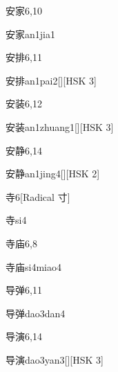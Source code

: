 \begin{entry}{安家}{6,10}
  \begin{phonetics}{安家}{an1jia1}
  \end{phonetics}
\end{entry}

\begin{entry}{安排}{6,11}
  \begin{phonetics}{安排}{an1pai2}[][HSK 3]
  \end{phonetics}
\end{entry}

\begin{entry}{安装}{6,12}
  \begin{phonetics}{安装}{an1zhuang1}[][HSK 3]
  \end{phonetics}
\end{entry}

\begin{entry}{安静}{6,14}
  \begin{phonetics}{安静}{an1jing4}[][HSK 2]
  \end{phonetics}
\end{entry}

\begin{entry}{寺}{6}[Radical 寸]
  \begin{phonetics}{寺}{si4}
  \end{phonetics}
\end{entry}

\begin{entry}{寺庙}{6,8}
  \begin{phonetics}{寺庙}{si4miao4}
  \end{phonetics}
\end{entry}

\begin{entry}{导弹}{6,11}
  \begin{phonetics}{导弹}{dao3dan4}
  \end{phonetics}
\end{entry}

\begin{entry}{导演}{6,14}
  \begin{phonetics}{导演}{dao3yan3}[][HSK 3]
  \end{phonetics}
\end{entry}

